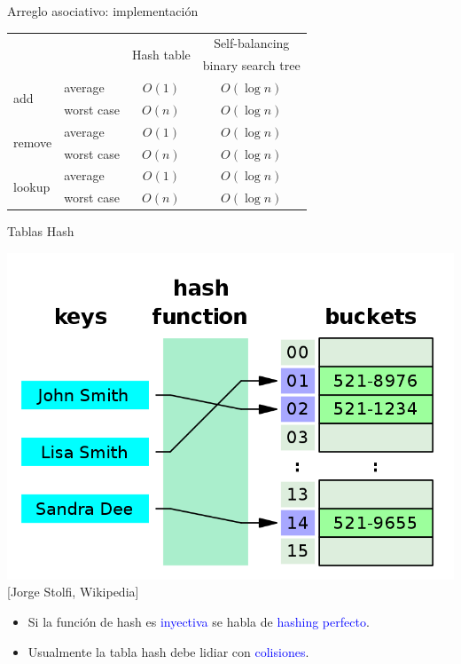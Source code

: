 \documentclass[handout]{beamer} %
\newcommand{\blue}[1]{\textcolor{blue}{#1}}
\begin{document}
\begin{frame}{Arreglo asociativo: implementación}
    \begin{center}
    \begin{tabular}{l|l|c|c}
        \multicolumn{2}{l|}{} & \multirow{2}{*}{Hash table} & Self-balancing\\
        \multicolumn{2}{l|}{} & & binary search tree \\\hline
        \multirow{2}{*}{add}  & average & $O(1)$ & $O(\log n)$\\\cline{2-4}
        & worst case & $O(n)$ & $O(\log n)$\\\hline
        \multirow{2}{*}{remove} & average & $O(1)$ & $O(\log n)$\\\cline{2-4}
        & worst case & $O(n)$ & $O(\log n)$\\\hline
        \multirow{2}{*}{lookup} & average & $O(1)$ & $O(\log n)$\\\cline{2-4}
        & worst case & $O(n)$ & $O(\log n)$\\
    \end{tabular}
    \end{center}
\end{frame}

\begin{frame}{Tablas Hash}
    \begin{center}
        \includegraphics[width=.7\textwidth]{./image/cap4/hash-table.png}\\
        {\tiny [Jorge Stolfi, Wikipedia]}
    \end{center}
    \vspace{-2ex}
    
    \begin{itemize}
      \item<2-> Si la función de hash es \blue{inyectiva} se habla de \blue{hashing perfecto}.
      \item<3-> Usualmente la tabla hash debe lidiar con \blue{colisiones}.
    \end{itemize}
\end{frame}
\end{document}
